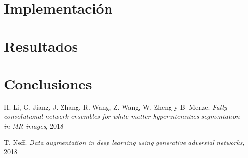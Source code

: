 \documentclass[12pt]{article}
\begin{document}
	\section{Implementación}
	
	\newpage
	
	\section{Resultados}
	
	\newpage
	
	\section{Conclusiones}
	
	\newpage
	
	\begin{thebibliography}{9}
	\raggedright
	
	H. Li, G. Jiang, J. Zhang, R. Wang, Z. Wang, W. Zheng y B. Menze. \textit{Fully convolutional network ensembles for white matter hyperintensities segmentation in MR images}, 2018
	
	T. Neff. \textit{Data augmentation in deep learning using generative adversial networks}, 2018

	\end{thebibliography}
	
\end{document}
